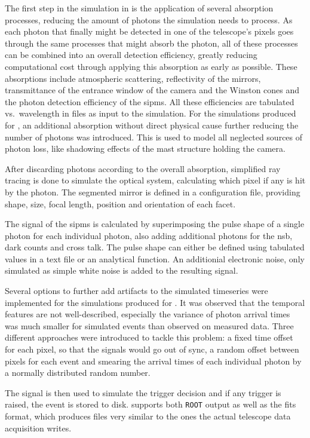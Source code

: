 The first step in the simulation in \ceres{} is the application of several absorption
processes, reducing the amount of photons the simulation needs to process.
As each photon that finally might be detected in one of the telescope's pixels 
goes through the same processes that might absorb the photon, all of these
processes can be combined into an overall detection efficiency, greatly reducing 
computational cost through applying this absorption as early as possible.
These absorptions include atmospheric scattering, reflectivity of the mirrors,
transmittance of the entrance window of the camera and the Winston cones and
the photon detection efficiency of the \glspl{sipm}.
All these efficiencies are tabulated vs.\ wavelength in files as input to the simulation.
For the simulations produced for \cite{phd-temme}, an additional absorption without
direct physical cause further reducing the number of photons was introduced.
This is used to model all neglected sources of photon loss, like shadowing effects
of the mast structure holding the camera.

After discarding photons according to the overall absorption,
simplified ray tracing is done to simulate the optical system,
calculating which pixel if any is hit by the photon.
The segmented mirror is defined in a configuration file,
providing shape, size, focal length, position and orientation of each facet.

The signal of the \glspl{sipm} is calculated by superimposing the pulse shape
of a single photon for each individual photon, also adding additional photons
for the \gls{nsb}, dark counts and cross talk.
The pulse shape can either be defined using tabulated values in a text file
or an analytical function.
An additionial electronic noise, only simulated as simple white noise is added to the resulting signal.

Several options to further add artifacts to the simulated timeseries 
were implemented for the simulations produced for \cite{phd-temme}.
It was observed that the temporal features are not well-described, 
especially the variance of photon arrival times was much smaller for simulated
events than observed on measured data.
Three different approaches were introduced to tackle this problem:
a fixed time offset for each pixel, so that the signals would go out of sync,
a random offset between pixels for each event and smearing the arrival times
of each individual photon by a normally distributed random number.

The signal is then used to simulate the trigger decision and if any trigger
is raised, the event is stored to disk.
\ceres{} supports both \texttt{ROOT} output as well as the \gls{fits} format,
which produces files very similar to the ones the actual telescope data acquisition
writes.

